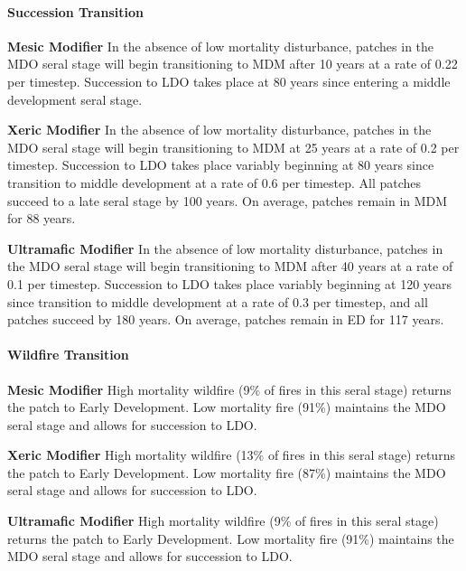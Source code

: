 \paragraph{Succession Transition}
\begin{adjustwidth}{2cm}{}

\noindent \textbf{Mesic Modifier } In the absence of low mortality disturbance, patches in the MDO seral stage will begin transitioning to MDM after 10 years at a rate of 0.22 per timestep. Succession to LDO takes place at 80 years since entering a middle development seral stage. 

\medskip
\noindent \textbf{Xeric Modifier} In the absence of low mortality disturbance, patches in the MDO seral stage will begin transitioning to MDM at 25 years at a rate of 0.2 per timestep. Succession to LDO takes place variably beginning at 80 years since transition to middle development at a rate of 0.6 per timestep. All patches succeed to a late seral stage by 100 years. On average, patches remain in MDM for 88 years.

\medskip
\noindent \textbf{Ultramafic Modifier} In the absence of low mortality disturbance, patches in the MDO seral stage will begin transitioning to MDM after 40 years at a rate of 0.1 per timestep. Succession to LDO takes place variably beginning at 120 years since transition to middle development at a rate of 0.3 per timestep, and all patches succeed by 180 years. On average, patches remain in ED for 117 years.

\end{adjustwidth}

\paragraph{Wildfire Transition}
\begin{adjustwidth}{2cm}{}
\noindent \textbf{Mesic Modifier } High mortality wildfire (9\% of fires in this seral stage) returns the patch to Early Development. Low mortality fire (91\%) maintains the MDO seral stage and allows for succession to LDO.

\medskip
\noindent \textbf{Xeric Modifier}  High mortality wildfire (13\% of fires in this seral stage) returns the patch to Early Development. Low mortality fire (87\%) maintains the MDO seral stage and allows for succession to LDO. 

\medskip
\noindent \textbf{Ultramafic Modifier}  High mortality wildfire (9\% of fires in this seral stage) returns the patch to Early Development. Low mortality fire (91\%) maintains the MDO seral stage and allows for succession to LDO.

\end{adjustwidth}

